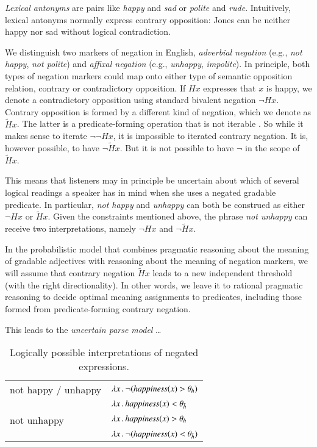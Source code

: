 \documentclass[fleqn,reqno,10pt]{article}
\begin{document}
\emph{Lexical antonyms} are pairs like \emph{happy} and \emph{sad} or \emph{polite} and
\emph{rude}. Intuitively, lexical antonyms normally express contrary opposition: Jones can be
neither happy nor sad without logical contradiction.

We distinguish two markers of negation in English, \emph{adverbial negation} (e.g., \emph{not
  happy}, \emph{not polite}) and \emph{affixal negation} (e.g., \emph{unhappy},
\emph{impolite}). In principle, both types of negation markers could map onto either type of
semantic opposition relation, contrary or contradictory opposition. If $Hx$ expresses that $x$
is happy, we denote a contradictory opposition using standard bivalent negation $\neg
Hx$.
Contrary opposition is formed by a different kind of negation, which we denote as
$\tilde{H}x$. The latter is a predicate-forming operation that is not iterable
\citep{Horn1989:A-Natural-Histo,sep-negation}. So while it makes sense to iterate $\neg \neg
Hx$, it is impossible to iterated contrary negation. It is, however possible, to have $\neg
\tilde{H}x$. But it is not possible to have $\neg$ in the scope of $\tilde{H}x$. 

This means that listeners may in principle be uncertain about which of several logical readings
a speaker has in mind when she uses a negated gradable predicate. In particular, \emph{not
  happy} and \emph{unhappy} can both be construed as either $\neg Hx$ or $\tilde{H}x$. Given
the constraints mentioned above, the phrase \emph{not unhappy} can receive two interpretations,
namely $\neg Hx$ and $\neg \tilde{H}x$. 

In the probabilistic model that combines pragmatic reasoning about the meaning of gradable
adjectives with reasoning about the meaning of negation markers, we will assume that contrary
negation $\tilde{H}x$ leads to a new independent threshold (with the right directionality). In
other words, we leave it to rational pragmatic reasoning to decide optimal meaning assignments
to predicates, including those formed from predicate-forming contrary negation. 

This leads to the \emph{uncertain parse model} \dots


\begin{table}
  \centering
  \begin{tabular}{ll}
    not happy / unhappy & $\lambda x \thinspace . \thinspace \neg (\mathit{happiness}(x) >
    \theta_{h})$ \\
    & $\lambda x \thinspace . \thinspace \mathit{happiness}(x) <
    \theta_{\tilde{h}}$ \\ \hline
    not unhappy & $\lambda x \thinspace . \thinspace \mathit{happiness}(x) >
    \theta_{h}$ \\
    & $\lambda x \thinspace . \thinspace \neg(\mathit{happiness}(x) <
    \theta_{\tilde{h}})$ \\ 
  \end{tabular}
  \caption{Logically possible interpretations of negated expressions.}
  \label{tab:Interpretations}
\end{table}



\printbibliography[heading=bibintoc]
\end{document}
